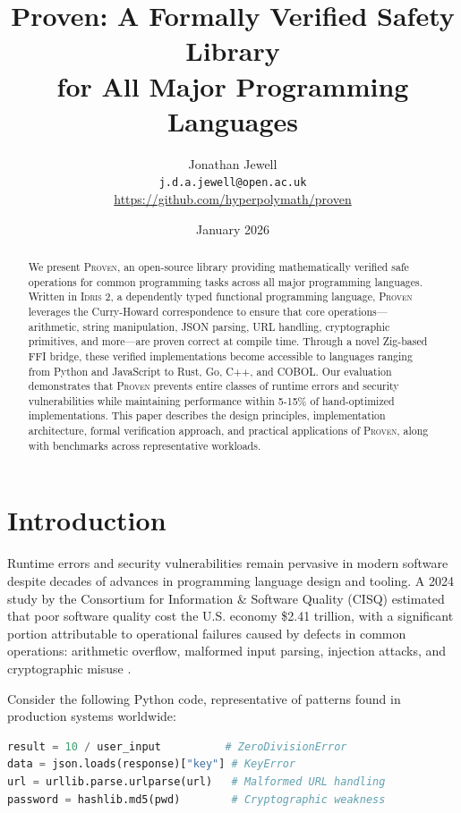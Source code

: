\documentclass[11pt,a4paper]{article}
\title{Proven: A Formally Verified Safety Library\\for All Major Programming Languages}
\author{
    Jonathan Jewell\\
    \texttt{j.d.a.jewell@open.ac.uk}\\
    \url{https://github.com/hyperpolymath/proven}
}
\date{January 2026}
\newcommand{\proven}{\textsc{Proven}}
\newcommand{\idris}{\textsc{Idris 2}}
\begin{document}
\maketitle

\begin{abstract}
We present \proven{}, an open-source library providing mathematically verified safe operations for common programming tasks across all major programming languages. Written in \idris{}, a dependently typed functional programming language, \proven{} leverages the Curry-Howard correspondence to ensure that core operations—arithmetic, string manipulation, JSON parsing, URL handling, cryptographic primitives, and more—are proven correct at compile time. Through a novel Zig-based FFI bridge, these verified implementations become accessible to languages ranging from Python and JavaScript to Rust, Go, C++, and COBOL. Our evaluation demonstrates that \proven{} prevents entire classes of runtime errors and security vulnerabilities while maintaining performance within 5-15\% of hand-optimized implementations. This paper describes the design principles, implementation architecture, formal verification approach, and practical applications of \proven{}, along with benchmarks across representative workloads.
\end{abstract}

\section{Introduction}

Runtime errors and security vulnerabilities remain pervasive in modern software despite decades of advances in programming language design and tooling. A 2024 study by the Consortium for Information \& Software Quality (CISQ) estimated that poor software quality cost the U.S. economy \$2.41 trillion, with a significant portion attributable to operational failures caused by defects in common operations: arithmetic overflow, malformed input parsing, injection attacks, and cryptographic misuse \cite{cisq2024}.

Consider the following Python code, representative of patterns found in production systems worldwide:

\begin{lstlisting}[language=Python]
result = 10 / user_input          # ZeroDivisionError
data = json.loads(response)["key"] # KeyError
url = urllib.parse.urlparse(url)   # Malformed URL handling
password = hashlib.md5(pwd)        # Cryptographic weakness
\end{lstlisting}
\end{document}
